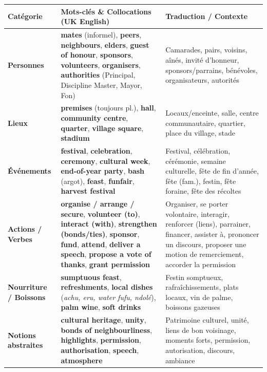 \documentclass[11pt]{article}
\begin{document}
\begin{center}
\begin{tabularx}{\linewidth}{|l|X|X|}\hline
\rowcolor{popblueL} \textbf{Catégorie} & \textbf{Mots-clés \& Collocations (UK English)} & \textbf{Traduction / Contexte} \\ \hline
\textbf{Personnes} & \textbf{mates} (informel), \textbf{peers}, \textbf{neighbours}, \textbf{elders}, \textbf{guest of honour}, \textbf{sponsors}, \textbf{volunteers}, \textbf{organisers}, \textbf{authorities} (Principal, Discipline Master, Mayor, Fon) & Camarades, pairs, voisins, aînés, invité d'honneur, sponsors/parrains, bénévoles, organisateurs, autorités \\ \hline
\textbf{Lieux} & \textbf{premises} (toujours pl.), \textbf{hall}, \textbf{community centre}, \textbf{quarter}, \textbf{village square}, \textbf{stadium} & Locaux/enceinte, salle, centre communautaire, quartier, place du village, stade \\ \hline
\textbf{Événements} & \textbf{festival}, \textbf{celebration}, \textbf{ceremony}, \textbf{cultural week}, \textbf{end-of-year party}, \textbf{bash} (argot), \textbf{feast}, \textbf{funfair}, \textbf{harvest festival} & Festival, célébration, cérémonie, semaine culturelle, fête de fin d'année, fête (fam.), festin, fête foraine, fête des récoltes \\ \hline
\textbf{Actions / Verbes} & \textbf{organise / arrange / secure}, \textbf{volunteer (to)}, \textbf{interact (with)}, \textbf{strengthen (bonds/ties)}, \textbf{sponsor}, \textbf{fund}, \textbf{attend}, \textbf{deliver a speech}, \textbf{propose a vote of thanks}, \textbf{grant permission} & Organiser, se porter volontaire, interagir, renforcer (liens), parrainer, financer, assister à, prononcer un discours, proposer une motion de remerciement, accorder la permission \\ \hline
\textbf{Nourriture / Boissons} & \textbf{sumptuous feast}, \textbf{refreshments}, \textbf{local dishes} (\textit{achu, eru, water fufu, ndolé}), \textbf{palm wine}, \textbf{soft drinks} & Festin somptueux, rafraîchissements, plats locaux, vin de palme, boissons gazeuses \\ \hline
\textbf{Notions abstraites} & \textbf{cultural heritage}, \textbf{unity}, \textbf{bonds of neighbourliness}, \textbf{highlights}, \textbf{permission}, \textbf{authorisation}, \textbf{speech}, \textbf{atmosphere} & Patrimoine culturel, unité, liens de bon voisinage, moments forts, permission, autorisation, discours, ambiance \\ \hline
\end{tabularx}
\end{center}
\end{document}
